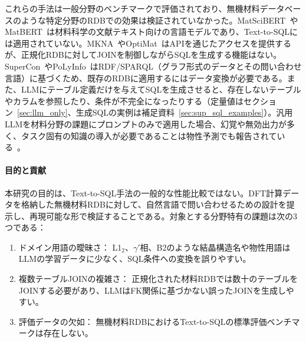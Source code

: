 \documentclass[twocolumn]{interact}
\begin{document}
これらの手法は一般分野のベンチマークで評価されており、無機材料データベースのような特定分野のRDBでの効果は検証されていなかった。MatSciBERT~\cite{gupta2022matscibert}やMatBERT~\cite{walker2021matbert}は材料科学の文献テキスト向けの言語モデルであり、Text-to-SQLには適用されていない。MKNA~\cite{zhuang2026mkna}やOptiMat~\cite{hu2026optimat}はAPIを通じたアクセスを提供するが、正規化RDBに対してJOINを制御しながらSQLを生成する機能はない。SuperCon~\cite{ishii2023supercon}やPoLyInfo~\cite{ishii2024polyinfo}はRDF/SPARQL（グラフ形式のデータとその問い合わせ言語）に基づくため、既存のRDBに適用するにはデータ変換が必要である。また、LLMにテーブル定義だけを与えてSQLを生成させると、存在しないテーブルやカラムを参照したり、条件が不完全になったりする（定量値はセクション~\ref{sec:llm_only}、生成SQLの実例は補足資料~\ref{sec:sup_sql_examples}）。汎用LLMを材料分野の課題にプロンプトのみで適用した場合、幻覚や無効出力が多く、タスク固有の知識の導入が必要であることは物性予測でも報告されている~\cite{rubungo2025llmmatbench}。

\paragraph*{目的と貢献}

本研究の目的は、Text-to-SQL手法の一般的な性能比較ではない。DFT計算データを格納した無機材料RDBに対して、自然言語で問い合わせるための設計を提示し、再現可能な形で検証することである。対象とする分野特有の課題は次の3つである：
\begin{enumerate}
  \item ドメイン用語の曖昧さ：
    L1$_2$、$\gamma'$相、B2のような結晶構造名や物性用語はLLMの学習データに少なく、SQL条件への変換を誤りやすい。
  \item 複数テーブルJOINの複雑さ：
    正規化された材料RDBでは数十のテーブルをJOINする必要があり、LLMはFK関係に基づかない誤ったJOINを生成しやすい。
  \item 評価データの欠如：
    無機材料RDBにおけるText-to-SQLの標準評価ベンチマークは存在しない。
\end{enumerate}
\end{document}
